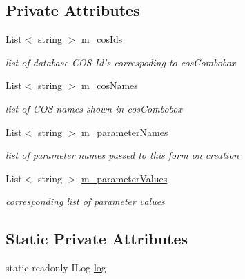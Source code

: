 \subsection*{Private Attributes}
\begin{DoxyCompactItemize}
\item 
List$<$ string $>$ \hyperlink{class_ias_pbx_config_1_1_classes_of_service_includes_aa035102cce05d98ea04f1efa76ba8038}{m\_\-cosIds}
\begin{DoxyCompactList}\small\item\em list of database COS Id's correspoding to cosCombobox \item\end{DoxyCompactList}\item 
List$<$ string $>$ \hyperlink{class_ias_pbx_config_1_1_classes_of_service_includes_a3b65b51c4adc787d70721576ed36f517}{m\_\-cosNames}
\begin{DoxyCompactList}\small\item\em list of COS names shown in cosCombobox \item\end{DoxyCompactList}\item 
List$<$ string $>$ \hyperlink{class_ias_pbx_config_1_1_classes_of_service_includes_a49839fa27002d5efe394c25bea712e5d}{m\_\-parameterNames}
\begin{DoxyCompactList}\small\item\em list of parameter names passed to this form on creation \item\end{DoxyCompactList}\item 
List$<$ string $>$ \hyperlink{class_ias_pbx_config_1_1_classes_of_service_includes_a797acd582bd34a112372aa3b957b4ddc}{m\_\-parameterValues}
\begin{DoxyCompactList}\small\item\em corresponding list of parameter values \item\end{DoxyCompactList}\end{DoxyCompactItemize}
\subsection*{Static Private Attributes}
\begin{DoxyCompactItemize}
\item 
static readonly ILog \hyperlink{class_ias_pbx_config_1_1_classes_of_service_includes_ad1e2f3e94e3693fcc43a769bbfd3a203}{log}
\end{DoxyCompactItemize}


